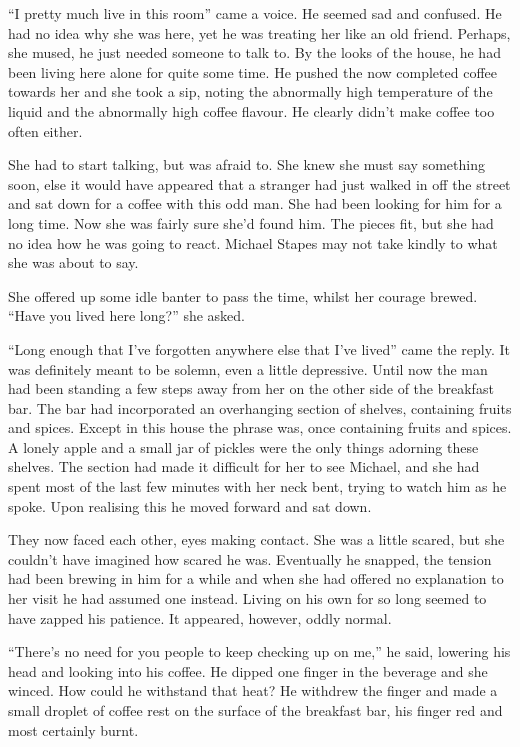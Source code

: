 ``I pretty much live in this room'' came a voice.  He seemed sad and confused.  He had no idea why she was here, yet he was treating her like an old friend.  Perhaps, she mused, he just needed someone to talk to.  By the looks of the house, he had been living here alone for quite some time.  He pushed the now completed coffee towards her and she took a sip, noting the abnormally high temperature of the liquid and the abnormally high coffee flavour.  He clearly didn't make coffee too often either.

She had to start talking, but was afraid to.  She knew she must say something soon, else it would have appeared that a stranger had just walked in off the street and sat down for a coffee with this odd man.  She had been looking for him for a long time.  Now she was fairly sure she'd found him.  The pieces fit, but she had no idea how he was going to react.  Michael Stapes may not take kindly to what she was about to say.  

She offered up some idle banter to pass the time, whilst her courage brewed.  ``Have you lived here long?'' she asked.  

``Long enough that I've forgotten anywhere else that I've lived'' came the reply.  It was definitely meant to be solemn, even a little depressive.  Until now the man had been standing a few steps away from her on the other side of the breakfast bar.  The bar had incorporated an overhanging section of shelves, containing fruits and spices.  Except in this house the phrase was, once containing fruits and spices.  A lonely apple and a small jar of pickles were the only things adorning these shelves.  The section had made it difficult for her to see Michael, and she had spent most of the last few minutes with her neck bent, trying to watch him as he spoke.  Upon realising this he moved forward and sat down.  

They now faced each other, eyes making contact.  She was a little scared, but she couldn't have imagined how scared he was.  Eventually he snapped, the tension had been brewing in him for a while and when she had offered no explanation to her visit he had assumed one instead.  Living on his own for so long seemed to have zapped his patience.  It appeared, however, oddly normal.  

``There's no need for you people to keep checking up on me,'' he said, lowering his head and looking into his coffee.  He dipped one finger in the beverage and she winced.  How could he withstand that heat?  He withdrew the finger and made a small droplet of coffee rest on the surface of the breakfast bar, his finger red and most certainly burnt.

